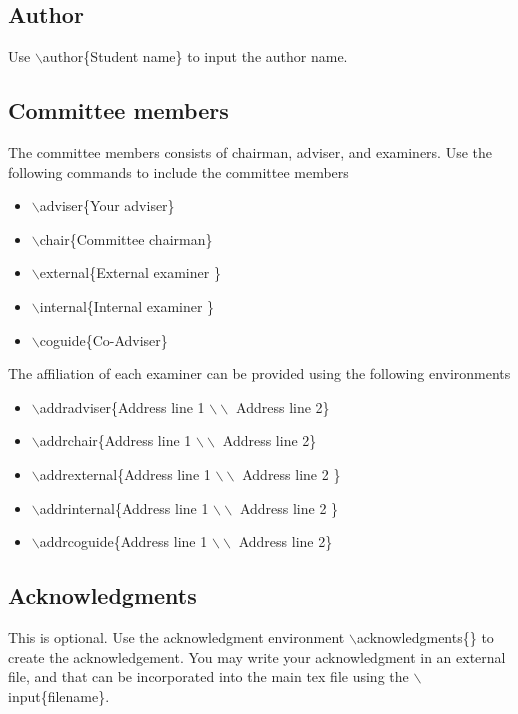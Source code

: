 \documentclass[a4paper,twoside]{iiththesis}
\begin{document}
\subsection{Author}
Use $ \backslash $author\{Student name\} to input the author name.

\subsection{Committee members}
The committee members consists of chairman, adviser, and examiners.  Use the following commands to include the committee members
\begin{itemize}
\item $ \backslash $adviser\{Your adviser\}
\item $ \backslash $chair\{Committee chairman\}
\item $ \backslash $external\{External examiner \}
\item $ \backslash $internal\{Internal examiner \}
\item $ \backslash $coguide\{Co-Adviser\}

\end{itemize}

The affiliation of each examiner can be provided using the following environments
\begin{itemize}
\item $ \backslash $addradviser\{Address line 1 $ \backslash \backslash $ Address line 2\}
\item $ \backslash $addrchair\{Address line 1 $ \backslash \backslash $ Address line 2\}
\item $ \backslash $addrexternal\{Address line 1 $ \backslash \backslash $ Address line 2 \}
\item $ \backslash $addrinternal\{Address line 1 $ \backslash \backslash $ Address line 2 \}
\item $ \backslash $addrcoguide\{Address line 1 $ \backslash \backslash $ Address line 2\}

\end{itemize}


\subsection{Acknowledgments}
This is optional. Use the acknowledgment environment $ \backslash $acknowledgments\{\}   to create the acknowledgement.
You may write your acknowledgment in an external file, and that can be incorporated into the main tex file using the $ \backslash $input\{filename\}.
\end{document}
